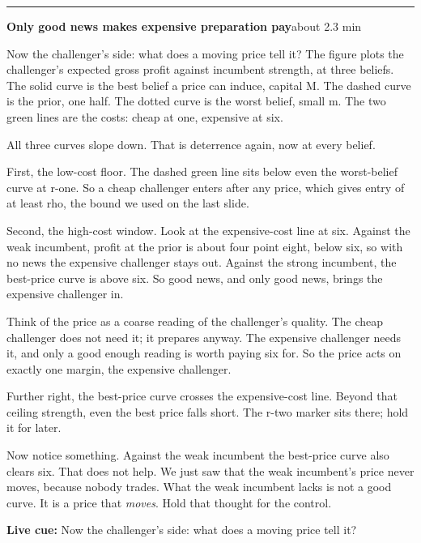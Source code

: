\documentclass[11pt]{article}
\newcommand{\Cue}[1]{\par\nobreak\smallskip\noindent
  \textcolor{ScriptGray}{\footnotesize\textbf{Live cue:} #1}\par}
\newcommand{\scriptframe}[3]{%
  \Needspace{9\baselineskip}%
  \par\medskip\noindent\textcolor{ScriptBlue}{\rule{\linewidth}{0.55pt}}%
  \par\smallskip\noindent
  \textbf{#1}\hfill\textcolor{ScriptGray}{\small #2}\par\smallskip
  #3\par}
\begin{document}
\scriptframe{Only good news makes expensive preparation pay}{about 2.3 min}{%
  Now the challenger's side: what does a moving price tell it? The figure plots
  the challenger's expected gross profit against incumbent strength, at three
  beliefs. The solid curve is the best belief a price can induce, capital M. The
  dashed curve is the prior, one half. The dotted curve is the worst belief,
  small m. The two green lines are the costs: cheap at one, expensive at six.

  All three curves slope down. That is deterrence again, now at every belief.

  First, the low-cost floor. The dashed green line sits below even the
  worst-belief curve at r-one. So a cheap challenger enters after any price,
  which gives entry of at least rho, the bound we used on the last slide.

  Second, the high-cost window. Look at the expensive-cost line at six. Against
  the weak incumbent, profit at the prior is about four point eight, below six,
  so with no news the expensive challenger stays out. Against the strong
  incumbent, the best-price curve is above six. So good news, and only good
  news, brings the expensive challenger in.

  Think of the price as a coarse reading of the challenger's quality. The cheap
  challenger does not need it; it prepares anyway. The expensive challenger
  needs it, and only a good enough reading is worth paying six for. So the price
  acts on exactly one margin, the expensive challenger.

  Further right, the best-price curve crosses the expensive-cost line. Beyond
  that ceiling strength, even the best price falls short. The r-two marker sits
  there; hold it for later.

  Now notice something. Against the weak incumbent the best-price curve also
  clears six. That does not help. We just saw that the weak incumbent's price
  never moves, because nobody trades. What the weak incumbent lacks is not a
  good curve. It is a price that \emph{moves}. Hold that thought for the control.
  \Cue{Now the challenger's side: what does a moving price tell it?}
}
\end{document}
